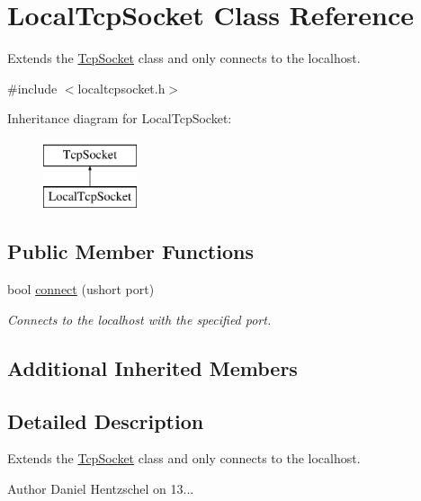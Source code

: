 \hypertarget{class_local_tcp_socket}{}\section{Local\+Tcp\+Socket Class Reference}
\label{class_local_tcp_socket}


Extends the \mbox{\hyperlink{class_tcp_socket}{Tcp\+Socket}} class and only connects to the localhost.  




{\ttfamily \#include $<$localtcpsocket.\+h$>$}

Inheritance diagram for Local\+Tcp\+Socket\+:\begin{figure}[H]
\begin{center}
\leavevmode
\includegraphics[height=2.000000cm]{class_local_tcp_socket}
\end{center}
\end{figure}
\subsection*{Public Member Functions}
\begin{DoxyCompactItemize}
\item 
bool \mbox{\hyperlink{class_local_tcp_socket_a3ffd411649714ba72f10a9d65f5e52ab}{connect}} (ushort port)
\begin{DoxyCompactList}\small\item\em Connects to the localhost with the specified port. \end{DoxyCompactList}\end{DoxyCompactItemize}
\subsection*{Additional Inherited Members}


\subsection{Detailed Description}
Extends the \mbox{\hyperlink{class_tcp_socket}{Tcp\+Socket}} class and only connects to the localhost. 

\begin{DoxyAuthor}{Author}
Daniel Hentzschel on 13... 
\end{DoxyAuthor}


